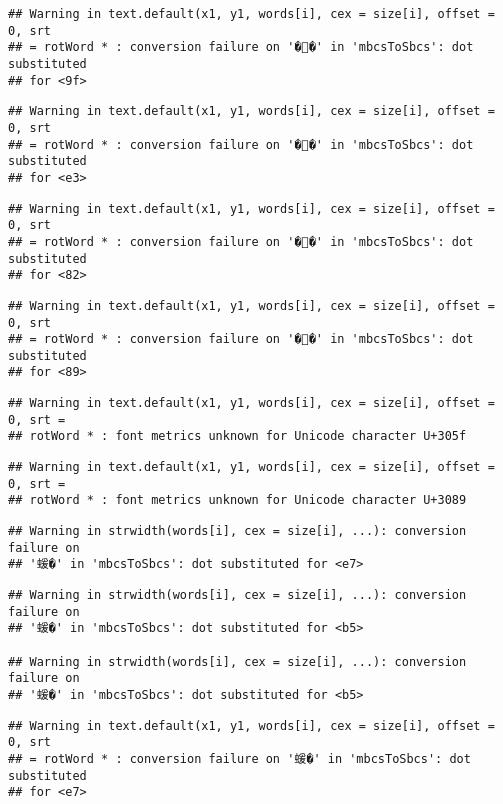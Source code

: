 \documentclass[]{article}
\begin{document}
\begin{verbatim}
## Warning in text.default(x1, y1, words[i], cex = size[i], offset = 0, srt
## = rotWord * : conversion failure on '��' in 'mbcsToSbcs': dot substituted
## for <9f>
\end{verbatim}

\begin{verbatim}
## Warning in text.default(x1, y1, words[i], cex = size[i], offset = 0, srt
## = rotWord * : conversion failure on '��' in 'mbcsToSbcs': dot substituted
## for <e3>
\end{verbatim}

\begin{verbatim}
## Warning in text.default(x1, y1, words[i], cex = size[i], offset = 0, srt
## = rotWord * : conversion failure on '��' in 'mbcsToSbcs': dot substituted
## for <82>
\end{verbatim}

\begin{verbatim}
## Warning in text.default(x1, y1, words[i], cex = size[i], offset = 0, srt
## = rotWord * : conversion failure on '��' in 'mbcsToSbcs': dot substituted
## for <89>
\end{verbatim}

\begin{verbatim}
## Warning in text.default(x1, y1, words[i], cex = size[i], offset = 0, srt =
## rotWord * : font metrics unknown for Unicode character U+305f
\end{verbatim}

\begin{verbatim}
## Warning in text.default(x1, y1, words[i], cex = size[i], offset = 0, srt =
## rotWord * : font metrics unknown for Unicode character U+3089
\end{verbatim}

\begin{verbatim}
## Warning in strwidth(words[i], cex = size[i], ...): conversion failure on
## '蝯�' in 'mbcsToSbcs': dot substituted for <e7>
\end{verbatim}

\begin{verbatim}
## Warning in strwidth(words[i], cex = size[i], ...): conversion failure on
## '蝯�' in 'mbcsToSbcs': dot substituted for <b5>

## Warning in strwidth(words[i], cex = size[i], ...): conversion failure on
## '蝯�' in 'mbcsToSbcs': dot substituted for <b5>
\end{verbatim}

\begin{verbatim}
## Warning in text.default(x1, y1, words[i], cex = size[i], offset = 0, srt
## = rotWord * : conversion failure on '蝯�' in 'mbcsToSbcs': dot substituted
## for <e7>
\end{verbatim}
\end{document}

